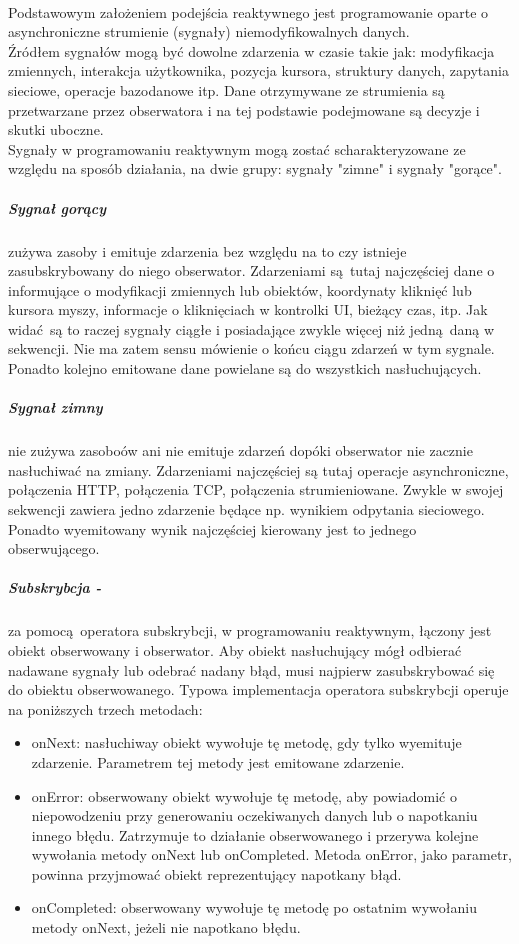 \documentclass[12pt,oneside,a4paper]{report}
\begin{document}
\paragraph{}Podstawowym założeniem podejścia reaktywnego jest programowanie oparte o asynchroniczne strumienie (sygnały) niemodyfikowalnych danych.\\
Źródłem sygnałów mogą być dowolne zdarzenia w czasie takie jak: modyfikacja zmiennych, interakcja użytkownika, pozycja kursora, struktury danych, zapytania sieciowe, operacje bazodanowe itp. Dane otrzymywane ze strumienia są przetwarzane przez obserwatora i na tej podstawie podejmowane są decyzje i skutki uboczne.\\
Sygnały w programowaniu reaktywnym mogą zostać scharakteryzowane ze względu na sposób działania, na dwie grupy: sygnały "zimne" i sygnały "gorące".
\subparagraph{Sygnał gorący} zużywa zasoby i emituje zdarzenia bez względu na to czy istnieje zasubskrybowany do niego obserwator. Zdarzeniami są tutaj najczęściej dane o informujące o modyfikacji zmiennych lub obiektów, koordynaty kliknięć lub kursora myszy, informacje o kliknięciach w kontrolki UI, bieżący czas, itp. Jak widać są to raczej sygnały ciągłe i posiadające zwykle więcej niż jedną daną w sekwencji. Nie ma zatem sensu mówienie o końcu ciągu zdarzeń w tym sygnale. Ponadto kolejno emitowane dane powielane są do wszystkich nasłuchujących.
\subparagraph{Sygnał zimny} nie zużywa zasoboów ani nie emituje zdarzeń dopóki obserwator nie zacznie nasłuchiwać na zmiany. Zdarzeniami najczęściej są tutaj operacje asynchroniczne, połączenia HTTP, połączenia TCP, połączenia strumieniowane. Zwykle w swojej sekwencji zawiera jedno zdarzenie będące np. wynikiem odpytania sieciowego. Ponadto wyemitowany wynik najczęściej kierowany jest to jednego obserwującego.
\subparagraph{Subskrybcja -}za pomocą operatora subskrybcji, w programowaniu reaktywnym, łączony jest obiekt obserwowany i obserwator. Aby obiekt nasłuchujący mógł odbierać nadawane sygnały lub odebrać nadany błąd, musi najpierw zasubskrybować się do obiektu obserwowanego. Typowa implementacja operatora subskrybcji operuje na poniższych trzech metodach:
\begin{itemize}
	\item onNext: nasłuchiway obiekt wywołuje tę metodę, gdy tylko wyemituje zdarzenie. Parametrem tej metody jest emitowane zdarzenie.
	\item onError: obserwowany obiekt wywołuje tę metodę, aby powiadomić o niepowodzeniu przy generowaniu oczekiwanych danych lub o napotkaniu innego błędu. Zatrzymuje to działanie obserwowanego i przerywa kolejne wywołania metody onNext lub onCompleted. Metoda onError, jako parametr, powinna przyjmować obiekt reprezentujący napotkany błąd.
	\item onCompleted: obserwowany wywołuje tę metodę po ostatnim wywołaniu metody onNext, jeżeli nie napotkano błędu.\\
\end{itemize}
\end{document}
